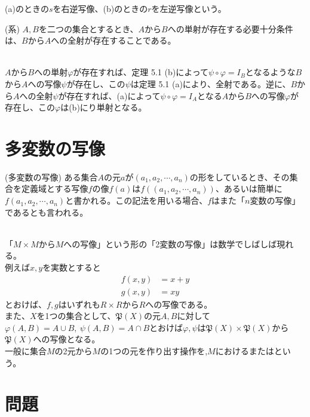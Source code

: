 \documentclass[a4j]{jsarticle}
\begin{document}
 (a)のときの$s$を右逆写像、(b)のときの$r$を左逆写像という。\\

\begin{itembox}[l]{ (系)}
	$A,B$を二つの集合とするとき、$A$から$B$への単射が存在する必要十分条件は、$B$から$A$への全射が存在することである。
\end{itembox}\\

 $A$から$B$への単射$\varphi$が存在すれば、定理 5.1 (b)によって$\psi \circ \varphi = I_B$となるような$B$から$A$への写像$\psi$が存在し、この$\psi$は定理 5.1 (a)により、全射である。逆に、$B$から$A$への全射$\psi$が存在すれば、(a)によって$\psi \circ \varphi = I_A$となる$A$から$B$への写像$\varphi$が存在し、この$\varphi$は(b)にり単射となる。

\section{多変数の写像}

\begin{itembox}[l]{ (多変数の写像)}
	ある集合$A$の元$a$が$(a_1,a_2,\cdots,a_n)$の形をしているとき、その集合を定義域とする写像$f$の像$f(a)$は$f((a_1,a_2,\cdots,a_n))$、あるいは簡単に$f(a_1,a_2,\cdots,a_n)$と書かれる。この記法を用いる場合、$f$はまた「$n$変数の写像」であるとも言われる。
\end{itembox}\\

 「$M \times M$から$M$への写像」という形の「2変数の写像」は数学でしばしば現れる。\\
例えば$x,y$を実数とすると
\begin{align}
	f(x,y) & = x + y \\
	g(x,y) & = xy
\end{align}
とおけば、$f,g$はいずれも$R \times R$から$R$への写像である。\\

また、$X$を1つの集合として、$\mathfrak{P}(X)$の元$A,B$に対して$\varphi(A,B) = A \cup B,\:\psi(A,B) = A \cap B$とおけば$\varphi,\psi$は$\mathfrak{P}(X) \times \mathfrak{P}(X)$から$\mathfrak{P}(X)$への写像となる。\\

一般に集合$M$の2元から$M$の1つの元を作り出す操作を,$M$におけるまたはという。

\section{問題}
\end{document}
